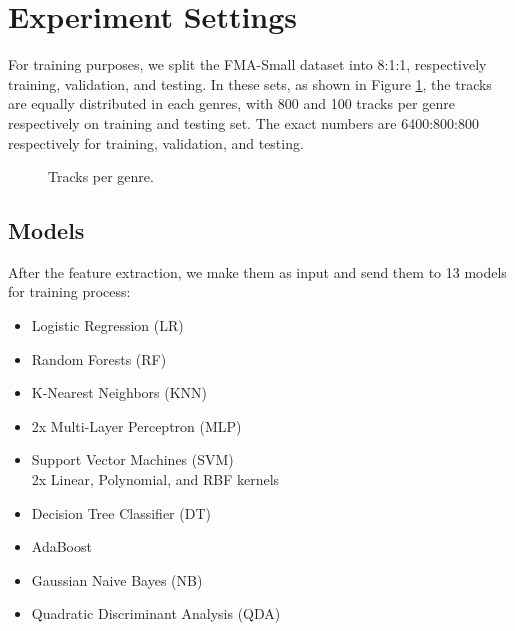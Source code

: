 \section{Experiment Settings}

For training purposes, we split the FMA-Small dataset into 8:1:1, respectively training, validation, and testing. In these sets, as shown in Figure \ref{fig:Tracks per genre}, the tracks are equally distributed in each genres, with 800 and 100 tracks per genre respectively on training and testing set. The exact numbers are 6400:800:800 respectively for training, validation, and testing.

\begin{figure}[b]
  \centering
  
  \caption{Tracks per genre.}
    \label{fig:Tracks per genre}
\end{figure}


\subsection{Models}
After the feature extraction, we make them as input and send them to 13 models for training process:




\begin{itemize}
    \item Logistic Regression (LR)
    \item Random Forests (RF)
    \item K-Nearest Neighbors (KNN)
    \item 2x Multi-Layer Perceptron (MLP)
    \item Support Vector Machines (SVM)\\2x Linear, Polynomial, and RBF kernels
    \item Decision Tree Classifier (DT)
    \item AdaBoost
    \item Gaussian Naive Bayes (NB)
    \item Quadratic Discriminant Analysis (QDA)
\end{itemize}
